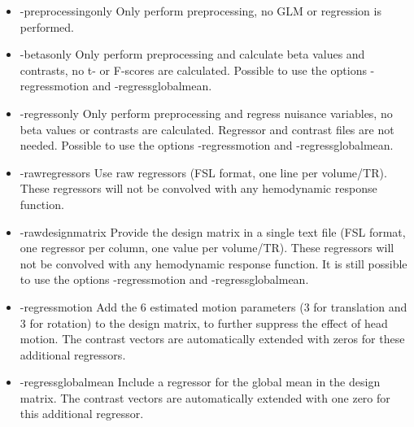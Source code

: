\begin{itemize}

\item -preprocessingonly
\newline \newline Only perform preprocessing, no GLM or regression is performed.

\item -betasonly
\newline \newline Only perform preprocessing and calculate beta values and contrasts, no t- or F-scores are calculated. Possible to use the options -regressmotion and -regressglobalmean.

\item -regressonly
\newline \newline Only perform preprocessing and regress nuisance variables, no beta values or contrasts are calculated. Regressor and contrast files are not needed. Possible to use the options -regressmotion and -regressglobalmean.

\item -rawregressors
\newline \newline Use raw regressors (FSL format, one line per volume/TR). These regressors will not be convolved with any hemodynamic response function.

\item -rawdesignmatrix 
\newline \newline Provide the design matrix in a single text file (FSL format, one regressor per column, one value per volume/TR). These regressors will not be convolved with any hemodynamic response function. It is still possible to use the options -regressmotion and -regressglobalmean.

\item -regressmotion 
\newline \newline Add the 6 estimated motion parameters (3 for translation and 3 for rotation) to the design matrix, to further suppress the effect of head motion. The contrast vectors are automatically extended with zeros for these additional regressors. 

\item -regressglobalmean 
\newline \newline Include a regressor for the global mean in the design matrix. The contrast vectors are automatically extended with one zero for this additional regressor. 
 

\end{itemize}
